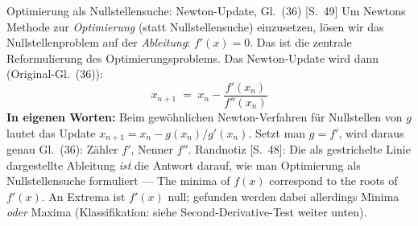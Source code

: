 \begin{satzbox}{Optimierung als Nullstellensuche: Newton-Update, Gl.~(36) [S.~49]}
Um Newtons Methode zur \emph{Optimierung} (statt Nullstellensuche) einzusetzen, lösen
wir das Nullstellenproblem auf der \emph{Ableitung}: $f'(x) = 0$. Das ist die zentrale
Reformulierung des Optimierungsproblems. Das Newton-Update wird dann
(Original-Gl.~(36)):
\[
  x_{n+1} \;=\; x_n - \frac{f'(x_n)}{f''(x_n)} \tag{36}
\]
\textbf{In eigenen Worten:} Beim gewöhnlichen Newton-Verfahren für Nullstellen von $g$
lautet das Update $x_{n+1} = x_n - g(x_n)/g'(x_n)$. Setzt man $g = f'$, wird daraus
genau Gl.~(36): Zähler $f'$, Nenner $f''$. Randnotiz [S.~48]: Die als gestrichelte Linie
dargestellte Ableitung \emph{ist} die Antwort darauf, wie man Optimierung als
Nullstellensuche formuliert --- \glqq The minima of $f(x)$ correspond to the roots of
$f'(x)$.\grqq{} An Extrema ist $f'(x)$ null; gefunden werden dabei allerdings Minima
\emph{oder} Maxima (Klassifikation: siehe Second-Derivative-Test weiter unten).
\end{satzbox}

